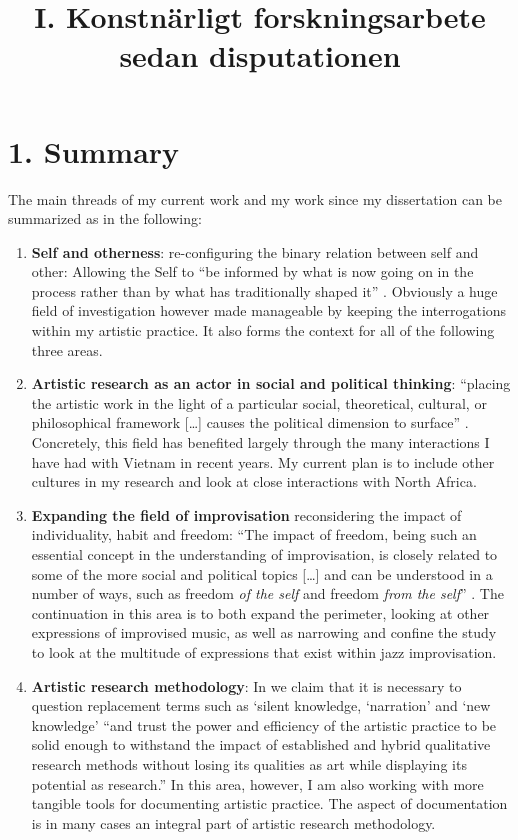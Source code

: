 \documentclass[a4paper]{article}
\title{I. Konstnärligt forskningsarbete sedan disputationen}
\date{}
\begin{document}
\maketitle

\thispagestyle{empty}

\section*{\textsf{1. Summary}}

The main threads of my current work and my work since my dissertation can be summarized as in the following:

\begin{enumerate}
\item \textbf{Self and otherness}: re-configuring the binary relation between self and other: Allowing the Self to ``be informed by what is now going on in the process rather than by what has traditionally shaped it'' \citep{frisk2013}. Obviously a huge field of investigation however made manageable by keeping the interrogations within my artistic practice. It also forms the context for all of the following three areas.
\item \textbf{Artistic research as an actor in social and political thinking}:  ``placing the artistic work in the light of a particular social, theoretical, cultural, or philosophical framework [\ldots] causes the political dimension to surface'' \citep{frisk-ost13}. Concretely, this field has benefited largely through the many interactions I have had with Vietnam in recent years. My current plan is to include other cultures in my research and look at close interactions with North Africa.
\item \textbf{Expanding the field of improvisation} reconsidering the impact of individuality, habit and freedom: ``The impact of freedom, being such an essential concept in the understanding of improvisation, is closely related to some of the more social and political topics [\ldots] and can be understood in a number of ways, such as freedom \emph{of the self} and freedom \emph{from the self}'' \citep{frisk12-improv}. The continuation in this area is to both expand the perimeter, looking at other expressions of improvised music, as well as narrowing and confine the study to look at the multitude of expressions that exist within jazz improvisation.
\item \textbf{Artistic research methodology}: In \citep{frisk-ost13} we claim that it is necessary to question replacement terms such as `silent knowledge, `narration' and `new knowledge' ``and trust the power and efficiency of the artistic practice to be solid enough to withstand the impact of established and hybrid qualitative research methods without losing its qualities as art while displaying its potential as research.'' In this area, however, I am also working with more tangible tools for documenting artistic practice. The aspect of documentation is in many cases an integral part of artistic research methodology.
\end{enumerate}
\end{document}
